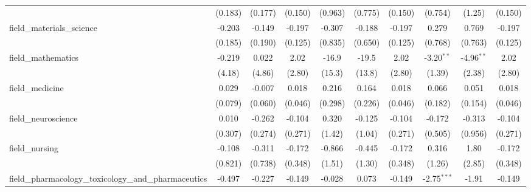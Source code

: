 \begin{tabular}{lccccccccc}
                                                               & (0.183)     & (0.177)       & (0.150)       & (0.963)  & (0.775)    & (0.150)       & (0.754)       & (1.25)        & (0.150)\\   
   field\_materials\_science                                   & -0.203      & -0.149        & -0.197        & -0.307   & -0.188     & -0.197        & 0.279         & 0.769         & -0.197\\   
                                                               & (0.185)     & (0.190)       & (0.125)       & (0.835)  & (0.650)    & (0.125)       & (0.768)       & (0.763)       & (0.125)\\   
   field\_mathematics                                          & -0.219      & 0.022         & 2.02          & -16.9    & -19.5      & 2.02          & -3.20$^{**}$  & -4.96$^{**}$  & 2.02\\   
                                                               & (4.18)      & (4.86)        & (2.80)        & (15.3)   & (13.8)     & (2.80)        & (1.39)        & (2.38)        & (2.80)\\   
   field\_medicine                                             & 0.029       & -0.007        & 0.018         & 0.216    & 0.164      & 0.018         & 0.066         & 0.051         & 0.018\\   
                                                               & (0.079)     & (0.060)       & (0.046)       & (0.298)  & (0.226)    & (0.046)       & (0.182)       & (0.154)       & (0.046)\\   
   field\_neuroscience                                         & 0.010       & -0.262        & -0.104        & 0.320    & -0.125     & -0.104        & -0.172        & -0.313        & -0.104\\   
                                                               & (0.307)     & (0.274)       & (0.271)       & (1.42)   & (1.04)     & (0.271)       & (0.505)       & (0.956)       & (0.271)\\   
   field\_nursing                                              & -0.108      & -0.311        & -0.172        & -0.866   & -0.445     & -0.172        & 0.316         & 1.80          & -0.172\\   
                                                               & (0.821)     & (0.738)       & (0.348)       & (1.51)   & (1.30)     & (0.348)       & (1.26)        & (2.85)        & (0.348)\\   
   field\_pharmacology\_toxicology\_and\_pharmaceutics         & -0.497      & -0.227        & -0.149        & -0.028   & 0.073      & -0.149        & -2.75$^{***}$ & -1.91         & -0.149\\   

\end{tabular}
